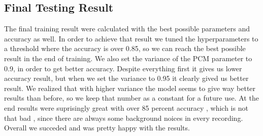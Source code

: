 \documentclass[english,12pt,oneside,a4paper]{article}
\begin{document}
		\subsection{Final Testing Result}
		The final training result were calculated with the best possible parameters and accuracy as well. In order to achieve that result we tuned the hyperparameters to a threshold where the accuracy is over 0.85, so we can reach the best possible result in the end of training. We also set the variance of the PCM parameter to 0.9, in order to get better accuracy. Despite everything first it gives us lower accuracy result, but when we set the variance to 0.95 it clearly gived us better result. We realized that with higher variance the model seems to give way better results than before, so we keep that number as a constant for a future use. At the end results were suprisingly great with over 85 percent accuracy , which is not that bad , since there are always some background noices in every recording. Overall we succeded and was pretty happy with the results.
\end{document}
